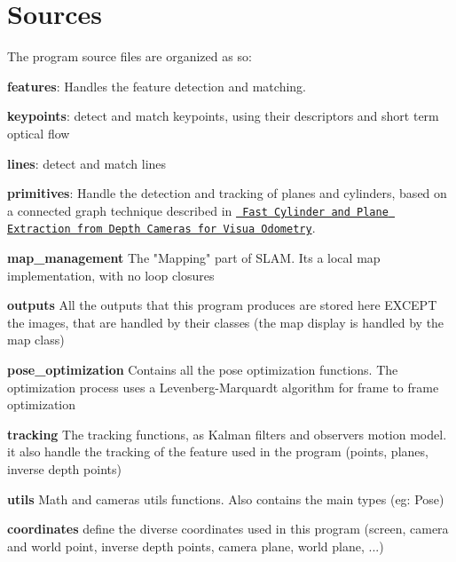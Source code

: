 \chapter{Sources}
\hypertarget{md__2home_2baptisteh_2_documents_2code_2robots_2_r_g_b___s_l_a_m_2_r_g_b-_d-_s_l_a_m_2src_2_r_e_a_d_m_e}{}\label{md__2home_2baptisteh_2_documents_2code_2robots_2_r_g_b___s_l_a_m_2_r_g_b-_d-_s_l_a_m_2src_2_r_e_a_d_m_e}
\label{md__2home_2baptisteh_2_documents_2code_2robots_2_r_g_b___s_l_a_m_2_r_g_b-_d-_s_l_a_m_2src_2_r_e_a_d_m_e_autotoc_md0}%
%
 The program source files are organized as so\+:
\begin{DoxyItemize}
\item {\bfseries{features}}\+: Handles the feature detection and matching.
\begin{DoxyItemize}
\item {\bfseries{keypoints}}\+: detect and match keypoints, using their descriptors and short term optical flow
\item {\bfseries{lines}}\+: detect and match lines
\item {\bfseries{primitives}}\+: Handle the detection and tracking of planes and cylinders, based on a connected graph technique described in \href{https://arxiv.org/pdf/1803.02380.pdf}{\texttt{ Fast Cylinder and Plane Extraction from Depth Cameras for Visua Odometry}}.
\end{DoxyItemize}
\item {\bfseries{map\+\_\+management}} The "{}\+Mapping"{} part of SLAM. It\textquotesingle{}s a local map implementation, with no loop closures
\item {\bfseries{outputs}} All the outputs that this program produces are stored here EXCEPT the images, that are handled by their classes (the map display is handled by the map class)
\item {\bfseries{pose\+\_\+optimization}} Contains all the pose optimization functions. The optimization process uses a Levenberg-\/\+Marquardt algorithm for frame to frame optimization
\item {\bfseries{tracking}} The tracking functions, as Kalman filters and observers motion model. it also handle the tracking of the feature used in the program (points, planes, inverse depth points)
\item {\bfseries{utils}} Math and cameras utils functions. Also contains the main types (eg\+: Pose)
\begin{DoxyItemize}
\item {\bfseries{coordinates}} define the diverse coordinates used in this program (screen, camera and world point, inverse depth points, camera plane, world plane, ...) 
\end{DoxyItemize}
\end{DoxyItemize}